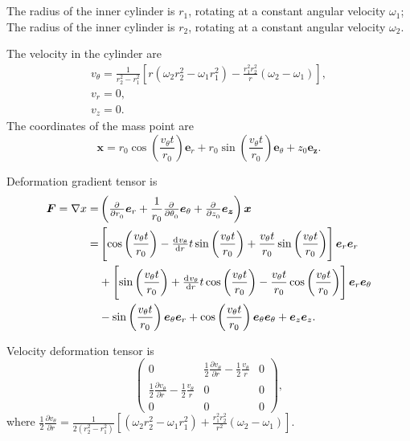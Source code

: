 \documentclass[12pt]{article}
\begin{document}
\section{}

The radius of the inner cylinder is $r_1$, rotating at a constant angular velocity $\omega_1$; The radius of the inner cylinder is $r_2$, rotating at a constant angular velocity $\omega_2$.

The velocity in the cylinder are
\begin{gather}
	v_{\theta} = \frac{1}{r^2_2-r^2_1}\left[r(\omega_2r^2_2-\omega_1r^2_1) - \frac{r_1^2r_2^2}{r}(\omega_2 - \omega_1) \right],\\
	v_r = 0,\\
	v_z = 0.
\end{gather}
The coordinates of the mass point are
\begin{equation}
	\bm{x} = r_0 \cos\left(\frac{v_\theta t}{r_0}\right)\bm{e}_r + r_0 \sin\left(\frac{v_\theta t}{r_0}\right)\bm{e}_\theta + z_0\bm{e_z}.
\end{equation}

Deformation gradient tensor is
\begin{equation}
	\begin{split}
		\bm{F} = \nabla x = & \left(\pd{}{r_0} \bm{e}_r + \frac{1}{r_0} \pd{}{\theta_0} \bm{e}_\theta + \pd{}{z_0} \bm{e_z}  \right) \bm{x}\\
		= & \left[\cos \left(\frac{v_\theta t}{r_0}\right) - \od{v_\theta}{r} t \sin \left(\frac{v_\theta t}{r_0}\right) + \frac{v_\theta t}{r_0} \sin \left(\frac{v_\theta t}{r_0}\right) \right]\bm{e}_r \bm{e}_r\\
		& + \left[\sin \left(\frac{v_\theta t}{r_0}\right) + \od{v_\theta}{r} t \cos \left(\frac{v_\theta t}{r_0}\right) - \frac{v_\theta t}{r_0} \cos \left(\frac{v_\theta t}{r_0}\right) \right]\bm{e}_r \bm{e}_\theta\\
		& - \sin \left(\frac{v_\theta t}{r_0}\right) \bm{e}_\theta \bm{e}_r + \cos \left(\frac{v_\theta t}{r_0}\right) \bm{e}_\theta\bm{e}_\theta + \bm{e}_z\bm{e}_z.
	\end{split}
\end{equation}

Velocity deformation tensor is
\begin{equation}
	\begin{pmatrix}
		0 & \frac{1}{2}\frac{\partial v_{\theta}}{\partial r} - \frac{1}{2}\frac{ v_{\theta}}{ r} & 0\\
		\frac{1}{2}\frac{\partial v_{\theta}}{\partial r} - \frac{1}{2}\frac{ v_{\theta}}{ r} & 0 & 0\\
		0 & 0 & 0
	\end{pmatrix},
\end{equation}
where $\frac{1}{2}\frac{\partial v_{\theta}}{\partial r} = \frac{1}{2(r^2_2-r^2_1)}\left[(\omega_2r^2_2-\omega_1r^2_1) + \frac{r_1^2r_2^2}{r^2}(\omega_2 - \omega_1) \right]$.
\end{document}
